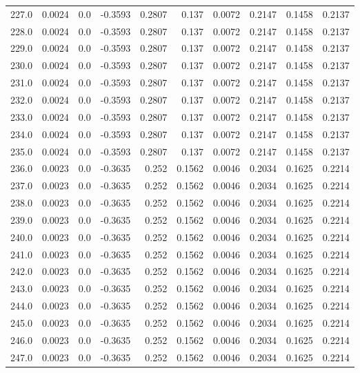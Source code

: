 \begin{longtable}{lrrrrrrrrr}
227.0 & 0.0024 & 0.0 & -0.3593 & 0.2807 & 0.137 & 0.0072 & 0.2147 & 0.1458 & 0.2137 \\
228.0 & 0.0024 & 0.0 & -0.3593 & 0.2807 & 0.137 & 0.0072 & 0.2147 & 0.1458 & 0.2137 \\
229.0 & 0.0024 & 0.0 & -0.3593 & 0.2807 & 0.137 & 0.0072 & 0.2147 & 0.1458 & 0.2137 \\
230.0 & 0.0024 & 0.0 & -0.3593 & 0.2807 & 0.137 & 0.0072 & 0.2147 & 0.1458 & 0.2137 \\
231.0 & 0.0024 & 0.0 & -0.3593 & 0.2807 & 0.137 & 0.0072 & 0.2147 & 0.1458 & 0.2137 \\
232.0 & 0.0024 & 0.0 & -0.3593 & 0.2807 & 0.137 & 0.0072 & 0.2147 & 0.1458 & 0.2137 \\
233.0 & 0.0024 & 0.0 & -0.3593 & 0.2807 & 0.137 & 0.0072 & 0.2147 & 0.1458 & 0.2137 \\
234.0 & 0.0024 & 0.0 & -0.3593 & 0.2807 & 0.137 & 0.0072 & 0.2147 & 0.1458 & 0.2137 \\
235.0 & 0.0024 & 0.0 & -0.3593 & 0.2807 & 0.137 & 0.0072 & 0.2147 & 0.1458 & 0.2137 \\
236.0 & 0.0023 & 0.0 & -0.3635 & 0.252 & 0.1562 & 0.0046 & 0.2034 & 0.1625 & 0.2214 \\
237.0 & 0.0023 & 0.0 & -0.3635 & 0.252 & 0.1562 & 0.0046 & 0.2034 & 0.1625 & 0.2214 \\
238.0 & 0.0023 & 0.0 & -0.3635 & 0.252 & 0.1562 & 0.0046 & 0.2034 & 0.1625 & 0.2214 \\
239.0 & 0.0023 & 0.0 & -0.3635 & 0.252 & 0.1562 & 0.0046 & 0.2034 & 0.1625 & 0.2214 \\
240.0 & 0.0023 & 0.0 & -0.3635 & 0.252 & 0.1562 & 0.0046 & 0.2034 & 0.1625 & 0.2214 \\
241.0 & 0.0023 & 0.0 & -0.3635 & 0.252 & 0.1562 & 0.0046 & 0.2034 & 0.1625 & 0.2214 \\
242.0 & 0.0023 & 0.0 & -0.3635 & 0.252 & 0.1562 & 0.0046 & 0.2034 & 0.1625 & 0.2214 \\
243.0 & 0.0023 & 0.0 & -0.3635 & 0.252 & 0.1562 & 0.0046 & 0.2034 & 0.1625 & 0.2214 \\
244.0 & 0.0023 & 0.0 & -0.3635 & 0.252 & 0.1562 & 0.0046 & 0.2034 & 0.1625 & 0.2214 \\
245.0 & 0.0023 & 0.0 & -0.3635 & 0.252 & 0.1562 & 0.0046 & 0.2034 & 0.1625 & 0.2214 \\
246.0 & 0.0023 & 0.0 & -0.3635 & 0.252 & 0.1562 & 0.0046 & 0.2034 & 0.1625 & 0.2214 \\
247.0 & 0.0023 & 0.0 & -0.3635 & 0.252 & 0.1562 & 0.0046 & 0.2034 & 0.1625 & 0.2214 \\

\end{longtable}
